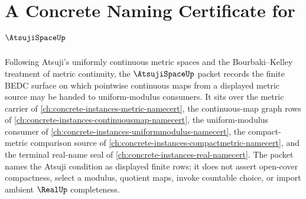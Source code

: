 \chapter{A Concrete Naming Certificate for $\AtsujiSpaceUp$}
\label{ch:concrete-instances-atsuji-space-namecert}

Following Atsuji's uniformly continuous metric spaces and the Bourbaki--Kelley treatment of metric continuity, the $\AtsujiSpaceUp$ packet records the finite BEDC surface on which pointwise continuous maps from a displayed metric source may be handed to uniform-modulus consumers. It sits over the metric carrier of \autoref{ch:concrete-instances-metric-namecert}, the continuous-map graph rows of \autoref{ch:concrete-instances-continuousmap-namecert}, the uniform-modulus consumer of \autoref{ch:concrete-instances-uniformmodulus-namecert}, the compact-metric comparison source of \autoref{ch:concrete-instances-compactmetric-namecert}, and the terminal real-name seal of \autoref{ch:concrete-instances-real-namecert}. The packet names the Atsuji condition as displayed finite rows; it does not assert open-cover compactness, select a modulus, quotient maps, invoke countable choice, or import ambient $\RealUp$ completeness.

